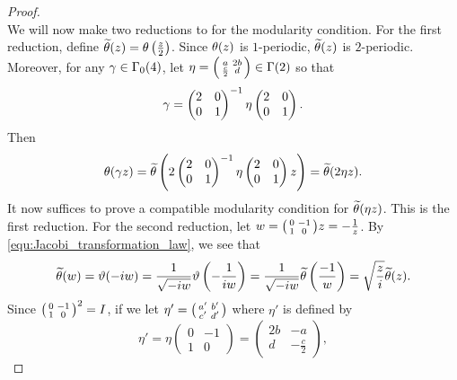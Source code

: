 \documentclass[12pt,reqno,oneside]{amsart}
\begin{document}
\begin{proof}
\[        \]
        We will now make two reductions to for the modularity condition. For the first reduction, define $\widetilde{\theta}(z) = \theta\left(\frac{z}{2}\right)$. Since $\theta(z)$ is $1$-periodic, $\widetilde{\theta}(z)$ is $2$-periodic. Moreover, for any $\gamma \in \Gamma_{0}(4)$, let $\eta = \begin{psmallmatrix} a & 2b \\ \frac{c}{2} & d\end{psmallmatrix} \in \Gamma(2)$ so that
        \[
            \gamma = \begin{pmatrix} 2 & 0 \\ 0 & 1 \end{pmatrix}^{-1} \eta \begin{pmatrix} 2 & 0 \\ 0 & 1 \end{pmatrix}.
        \]
        Then
        \begin{equation}\label{equ:reduction_1}
            \theta(\gamma z) = \widetilde{\theta}\left(2\begin{pmatrix} 2 & 0 \\ 0 & 1 \end{pmatrix}^{-1} \eta \begin{pmatrix} 2 & 0 \\ 0 & 1 \end{pmatrix}z\right) = \widetilde{\theta}(2\eta z).
        \end{equation}
        It now suffices to prove a compatible modularity condition for $\widetilde{\theta}(\eta z)$. This is the first reduction. For the second reduction, let $w = \begin{psmallmatrix} 0 & -1 \\ 1 & 0 \end{psmallmatrix}z = -\frac{1}{z}$. By \cref{equ:Jacobi_transformation_law}, we see that
        \[
            \widetilde{\theta}(w) = \vartheta(-iw) = \frac{1}{\sqrt{-iw}}\vartheta\left(-\frac{1}{iw}\right) = \frac{1}{\sqrt{-iw}}\widetilde{\theta}\left(\frac{-1}{w}\right) = \sqrt{\frac{z}{i}}\widetilde{\theta}(z).
        \]
        Since $\begin{psmallmatrix} 0 & -1 \\ 1 & 0 \end{psmallmatrix}^{2} = I$, if we let $\eta' = \begin{psmallmatrix} a' & b' \\ c' & d' \end{psmallmatrix}$ where $\eta'$ is defined by
        \[
            \eta' = \eta\begin{pmatrix} 0 & -1 \\ 1 & 0 \end{pmatrix} = \begin{pmatrix} 2b & -a \\ d & -\frac{c}{2} \end{pmatrix},
\]
\end{proof}
\end{document}
